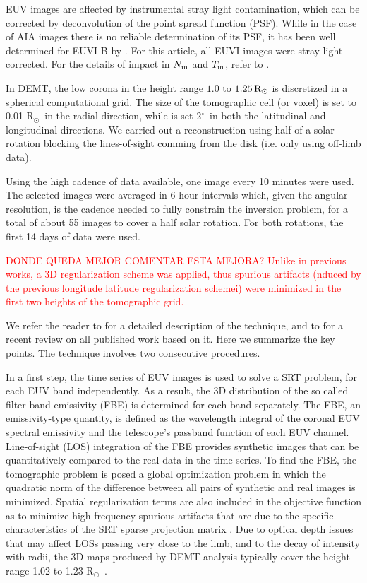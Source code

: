 \documentclass[namedreferences]{solarphysics}
\renewcommand{\deg}{$^\circ$}
\newcommand{\rsun}{R{$_\odot$}}
\newcommand{\mrsun}{{\rm R_\odot}}
\newcommand{\Tm}{T_{\rm m}}
\newcommand{\Nm}{N_{\rm m}}
\def\diego#1{\textcolor{red}{#1}}
\begin{document}
\begin{article}
EUV images are affected by instrumental stray light contamination, which can be corrected by deconvolution of the point spread function (PSF). While in the case of AIA images there is no reliable determination of its PSF, it has been well determined for EUVI-B by \citet{shearer_2012}. For this article, all EUVI images were stray-light corrected. For the details of impact in $\Nm$ and $\Tm$, refer to \citet{lloveras_ba2017}.

In DEMT, the low corona in the height range $1.0$ to $1.25\,\mrsun$ is discretized in a spherical computational grid. The size of the tomographic cell (or voxel) is set to 0.01 \rsun \ in the radial direction, while is set 2\deg\ in both the latitudinal and longitudinal directions. We carried out a reconstruction using half of a solar rotation blocking the lines-of-sight comming from the disk (i.e. only using off-limb data).

Using the high cadence of data available, one image every 10 minutes were used. The selected images were averaged in 6-hour intervals which, given the angular resolution, is the cadence needed to fully constrain the inversion problem, for a total of about 55 images to cover a half solar rotation. For both rotations, the first 14 days of data were used.

\diego{ DONDE QUEDA MEJOR COMENTAR ESTA MEJORA?
Unlike in previous works, a 3D regularization scheme was applied, thus spurious artifacts (nduced by the previous longitude latitude regularization schemei) were minimized in the first two heights of the tomographic grid.}

We refer the reader to \citet{frazin_2009} for a detailed description of the technique, and to \citet{vasquez_2016} for a recent review on all published work based on it. Here we summarize the key points. The technique involves two consecutive procedures.

In a first step, the time series of EUV images is used to solve a SRT problem, for each EUV band independently. As a result, the 3D distribution of the so called {filter band emissivity} (FBE) is determined for each band separately. The FBE, {an emissivity-type quantity}, is defined as the wavelength integral of the coronal EUV spectral emissivity and the telescope's passband function of each EUV channel. Line-of-sight (LOS) integration of the FBE provides synthetic images that can be quantitatively compared to the real data in the time series. To find the FBE, the tomographic problem is posed a global optimization problem in which the quadratic norm of the difference between all pairs of synthetic and real images is minimized. Spatial regularization terms are also included in the objective function as to minimize high frequency spurious artifacts that are due to the specific characteristics of the SRT sparse projection matrix \citep{frazin_2009,frazin_2000}. {Due to optical depth issues that may affect LOSs} passing very close to the limb, and to the decay of intensity with radii, the 3D maps produced by DEMT analysis typically cover the height range 1.02 to 1.23 \rsun \ \citep{frazin_2009}.


\end{article}
\end{document}
